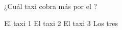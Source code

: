 ¿Cuál taxi cobra más por el ?

\begin{oneparchoices}
    \CorrectChoice El taxi 1
    \choice El taxi 2
    \choice El taxi 3
    \choice Los tres
\end{oneparchoices}
